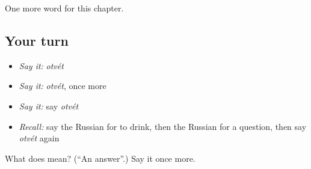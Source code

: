 \begin{grammarlens}[title={What you've built}]
One more word for this chapter.
\end{grammarlens}

\subsection*{Your turn}
\begin{itemize}
\raggedright
  \item \emph{Say it:} \emph{otvét}
  \item \emph{Say it:} \emph{otvét}, once more
  \item \emph{Say it:} say \emph{otvét}
  \item \emph{Recall:} say the Russian for to drink, then the Russian for a question, then say \emph{otvét} again
\end{itemize}

\begin{tcolorbox}[breakable,colback=teal!4,colframe=teal!35!black,title={Before you move on}]
What does  mean? (\textquotedblleft{}An answer\textquotedblright{}.) Say it once more.
\end{tcolorbox}

